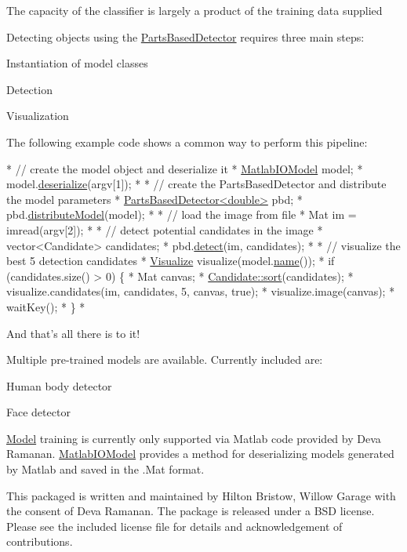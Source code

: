 The capacity of the classifier is largely a product of the training data supplied

Detecting objects using the \hyperlink{class_parts_based_detector}{Parts\-Based\-Detector} requires three main steps\-:
\begin{DoxyItemize}
\item Instantiation of model classes
\item Detection
\item Visualization
\end{DoxyItemize}

The following example code shows a common way to perform this pipeline\-: 
\begin{DoxyCode}
* \textcolor{comment}{// create the model object and deserialize it}
* \hyperlink{class_matlab_i_o_model}{MatlabIOModel} model;
* model.\hyperlink{class_matlab_i_o_model_a223538821bf7944a26433f7f99017f8b}{deserialize}(argv[1]);
*
* \textcolor{comment}{// create the PartsBasedDetector and distribute the model parameters}
* \hyperlink{class_parts_based_detector}{PartsBasedDetector<double>} pbd;
* pbd.\hyperlink{class_parts_based_detector_a351a499cb2d7ab23d388a34c1c8f38a0}{distributeModel}(model);
*
* \textcolor{comment}{// load the image from file}
* Mat im = imread(argv[2]);
*
* \textcolor{comment}{// detect potential candidates in the image}
* vector<Candidate> candidates;
* pbd.\hyperlink{class_parts_based_detector_a70c77effade6c39b06ddc0102973a1f8}{detect}(im, candidates);
*
* \textcolor{comment}{// visualize the best 5 detection candidates}
* \hyperlink{class_visualize}{Visualize} visualize(model.\hyperlink{class_model_aeae6527ff13db7724c53c942029d882d}{name}());
* \textcolor{keywordflow}{if} (candidates.size() > 0) \{
*  Mat canvas;
*   \hyperlink{class_candidate_a7e0776d9b8b7496d49f46298e93d0271}{Candidate::sort}(candidates);
*   visualize.candidates(im, candidates, 5, canvas, \textcolor{keyword}{true});
*   visualize.image(canvas);
*   waitKey();
* \}
* 
\end{DoxyCode}


And that's all there is to it!

Multiple pre-\/trained models are available. Currently included are\-:
\begin{DoxyItemize}
\item Human body detector
\item Face detector
\end{DoxyItemize}

\hyperlink{class_model}{Model} training is currently only supported via Matlab code provided by Deva Ramanan. \hyperlink{class_matlab_i_o_model}{Matlab\-I\-O\-Model} provides a method for deserializing models generated by Matlab and saved in the .Mat format. 



This packaged is written and maintained by Hilton Bristow, Willow Garage with the consent of Deva Ramanan. The package is released under a B\-S\-D license. Please see the included license file for details and acknowledgement of contributions. 